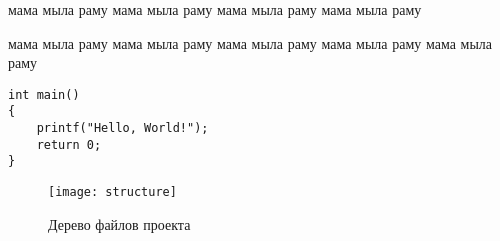 \begin{center}
\WorkType

\Topic
\end{center}

мама мыла раму
мама мыла раму
мама мыла раму
мама мыла раму

                   мама                      мыла раму
мама мыла раму
										мама мыла раму
мама 					мыла раму
мама мыла раму



\begin{lstlisting}[style=cpp,caption={Листинг программы}]
int main()
{
    printf("Hello, World!");
    return 0;
}
\end{lstlisting}


\begin{figure}[H]
\centering
\texttt{[image: structure]}
\caption{Дерево файлов проекта}
\label{fig:structure2}
\end{figure}

